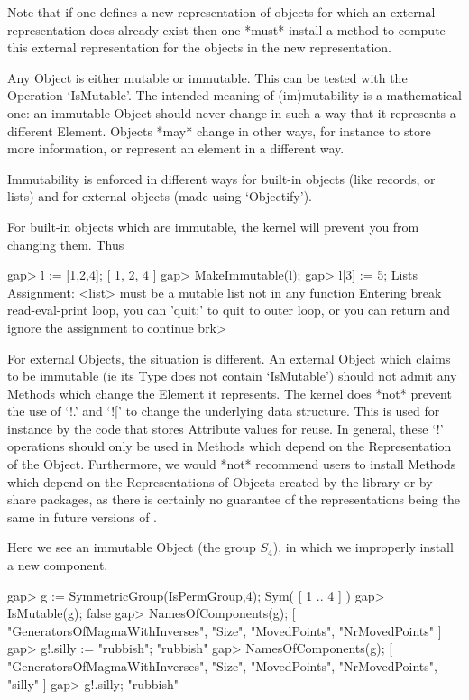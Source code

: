 Note that if one defines a new representation of objects for which an
external representation does already exist
then one *must* install a method to compute this external representation
for the objects in the new representation.


Any {\GAP} Object is either mutable or immutable. This can be tested
with the Operation `IsMutable'. The intended meaning of (im)mutability
is a mathematical one:  an immutable Object should never change in
such a way that it represents a different Element. Objects *may*
change in other ways, for instance to store more information, or
represent an element in a different way.

Immutability is enforced in different ways for built-in objects (like
records, or lists) and for external objects (made using `Objectify').

For built-in objects which are immutable, the kernel will prevent
you from changing them. Thus

\beginexample
gap> l := [1,2,4];
[ 1, 2, 4 ]
gap> MakeImmutable(l);
gap> l[3] := 5;
Lists Assignment: <list> must be a mutable list
not in any function
Entering break read-eval-print loop, you can 'quit;' to quit to outer loop,
or you can return and ignore the assignment to continue
brk> 
\endexample

For external Objects, the situation is different. An external Object which
claims to be immutable (ie its Type does not contain `IsMutable')
should not admit any Methods which change the Element it represents.
The kernel does *not* prevent the use of `!.' and `![' to change the
underlying data structure.
This is used for instance by the code that stores Attribute values for reuse.
In general, these `!' operations should only be used in Methods
which depend on the Representation of the Object. Furthermore, we would *not*
recommend users to install Methods which depend on the Representations of
Objects created by the library or by share packages, as there is certainly no
guarantee of the representations being the same in future versions of {\GAP}.

Here we see an immutable Object (the group $S_4$), in which we improperly
install a new component.

\beginexample
gap> g := SymmetricGroup(IsPermGroup,4);
Sym( [ 1 .. 4 ] )
gap> IsMutable(g);
false
gap> NamesOfComponents(g);
[ "GeneratorsOfMagmaWithInverses", "Size", "MovedPoints", "NrMovedPoints" ]
gap> g!.silly := "rubbish";
"rubbish"
gap> NamesOfComponents(g);
[ "GeneratorsOfMagmaWithInverses", "Size", "MovedPoints", "NrMovedPoints", 
  "silly" ]
gap> g!.silly;
"rubbish"
\endexample

